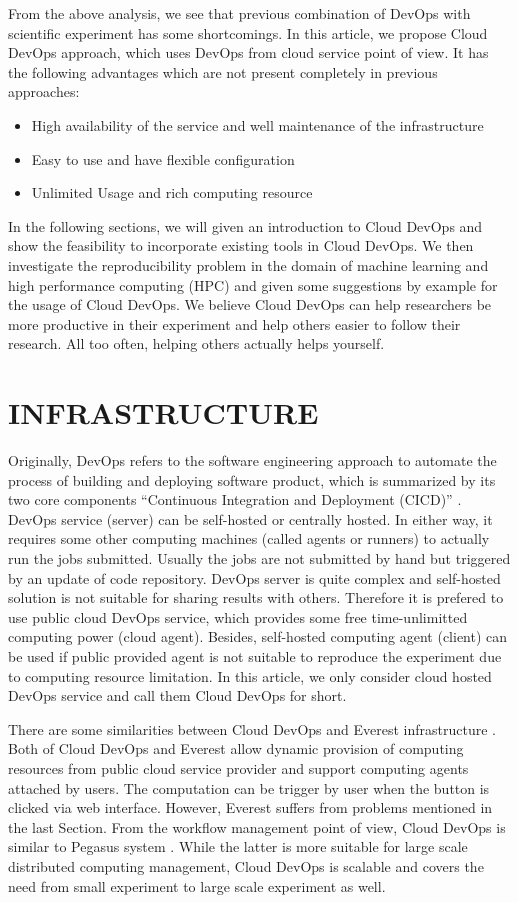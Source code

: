 \documentclass{IEEEcsmag}
\begin{document}
From the above analysis, we see that previous combination of DevOps with scientific experiment has some shortcomings. In this article, we propose Cloud DevOps approach, which uses DevOps from cloud service point of view. It has the following advantages which are not present completely in previous approaches:
\begin{itemize}
	\item High availability of the service and well maintenance of the infrastructure
	\item Easy to use and have flexible configuration
	\item Unlimited Usage and rich computing resource
\end{itemize}
 In the following sections, we will given an introduction to Cloud DevOps and show the feasibility to incorporate existing tools in Cloud DevOps. We then investigate the reproducibility problem in the domain of machine learning and high performance computing (HPC) and given some suggestions by example for the usage of Cloud DevOps. We believe Cloud DevOps can help researchers be more productive in their experiment and help others easier to follow their research. All too often, helping others actually helps yourself.

\section{INFRASTRUCTURE}
Originally, DevOps refers to the software engineering approach to automate the process of building and deploying software product, which is summarized by its two core components ``Continuous Integration and Deployment (CICD)'' \cite{bass2015devops}. 
DevOps service (server) can be self-hosted or centrally hosted. In either way, it requires some other computing machines (called agents or runners) to actually run the jobs submitted. Usually the jobs are not submitted by hand but triggered by an update of code repository. 
DevOps server is quite complex and self-hosted solution is not suitable for sharing results with others. Therefore it is prefered to use public cloud DevOps service, which provides some free time-unlimitted computing power (cloud agent). Besides, self-hosted computing agent (client) can be used if public provided agent is not suitable to reproduce the experiment due to computing resource limitation. In this article, we only consider cloud hosted DevOps service and call them Cloud DevOps for short.

There are some similarities between Cloud DevOps and Everest infrastructure \cite{GavishD12} . Both of Cloud DevOps and Everest allow dynamic provision of computing resources from public cloud service provider and support computing agents attached by users. The computation can be trigger by user when the button is clicked via web interface.
However, Everest suffers from problems mentioned in the last Section. From the workflow management point of view, Cloud DevOps is similar to Pegasus system \cite{Pegasus}. While the latter is more suitable for large scale distributed computing management, Cloud DevOps is scalable and covers the need from small experiment to large scale experiment as well.
\end{document}
